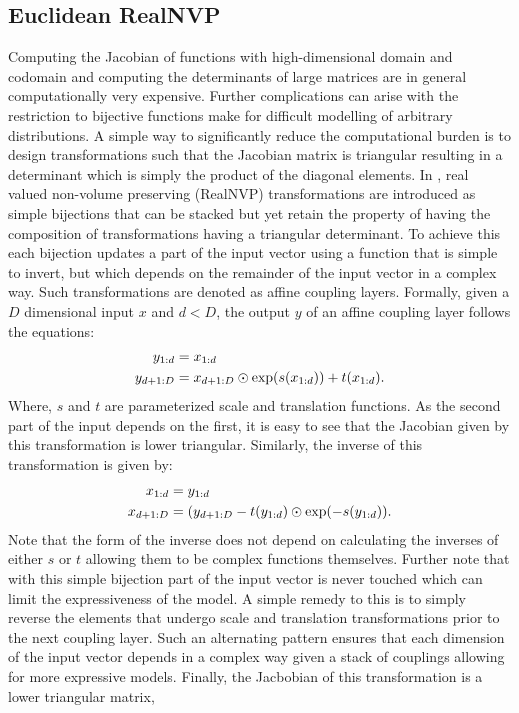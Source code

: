 \subsection{Euclidean RealNVP}
\label{Euclidean_RealNVP_appendix}
Computing the Jacobian of functions with high-dimensional domain and codomain and computing the determinants of large matrices are in general computationally very expensive. Further complications can arise with the restriction to bijective functions make for difficult modelling of arbitrary distributions. A simple way to significantly reduce the computational burden is to design transformations such that the Jacobian matrix is triangular resulting in a determinant which is simply the product of the diagonal elements. In \cite{dinh2016density}, real valued non-volume preserving (RealNVP) transformations are introduced as simple bijections that can be stacked but yet retain the property of having the composition of transformations having a triangular determinant. To achieve this each bijection updates a part of the input vector using a function that is simple to invert,
but which depends on the remainder of the input vector in a complex way. Such transformations are denoted  as affine coupling layers. Formally, given a $D$ dimensional input $x$ and $d < D$, the output $y$ of an affine coupling layer follows the equations:
\begin{align}
    y_{1:d} & = x_{1:d} \\
    y_{d+1:D} & = x_{d+1:D} \odot \textnormal{exp}(s(x_{1:d})) + t(x_{1:d}).
\end{align}
Where, $s$ and $t$ are parameterized scale and translation functions. As the second part of the input depends on the first, it is easy to see that the Jacobian given by this transformation is lower triangular. Similarly, the inverse of this transformation is given by:
\begin{align}
     x_{1:d} & = y_{1:d} \\
    x_{d+1:D} & = (y_{d+1:D} - t(y_{1:d})\odot \textnormal{exp}(-s(y_{1:d})).
\end{align}
Note that the form of the inverse does not depend on calculating the inverses of either $s$ or $t$ allowing them to be complex functions themselves. Further note that with this simple bijection part of the input vector is never touched which can limit the expressiveness of the model. A simple remedy to this is to simply reverse the elements that undergo scale and translation transformations prior to the next coupling layer. Such an alternating pattern ensures that each dimension of the input vector depends in a complex way given a stack of couplings allowing for more expressive models. Finally, the Jacbobian of this transformation is a lower triangular matrix,
